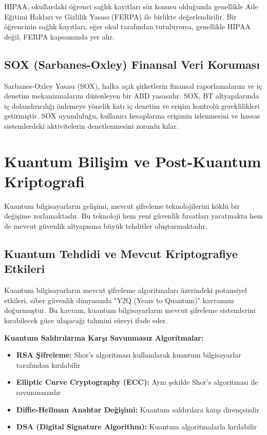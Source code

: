 HIPAA, okullardaki öğrenci sağlık kayıtları söz konusu olduğunda genellikle Aile Eğitimi Hakları ve Gizlilik Yasası (FERPA) ile birlikte değerlendirilir. Bir öğrencinin sağlık kayıtları, eğer okul tarafından tutuluyorsa, genellikle HIPAA değil, FERPA kapsamında yer alır.

\subsection{SOX (Sarbanes-Oxley) Finansal Veri Koruması}

Sarbanes-Oxley Yasası (SOX), halka açık şirketlerin finansal raporlamalarını ve iç denetim mekanizmalarını düzenleyen bir ABD yasasıdır. SOX, BT altyapılarında iç dolandırıcılığı önlemeye yönelik katı iç denetim ve erişim kontrolü gereklilikleri getirmiştir. SOX uyumluluğu, kullanıcı hesaplarına erişimin izlenmesini ve hassas sistemlerdeki aktivitelerin denetlenmesini zorunlu kılar.

\section{Kuantum Bilişim ve Post-Kuantum Kriptografi}

Kuantum bilgisayarların gelişimi, mevcut şifreleme teknolojilerini köklü bir değişime zorlamaktadır. Bu teknoloji hem yeni güvenlik fırsatları yaratmakta hem de mevcut güvenlik altyapısına büyük tehditler oluşturmaktadır.

\subsection{Kuantum Tehdidi ve Mevcut Kriptografiye Etkileri}

Kuantum bilgisayarların mevcut şifreleme algoritmaları üzerindeki potansiyel etkileri, siber güvenlik dünyasında "Y2Q (Years to Quantum)" kavramını doğurmuştur. Bu kavram, kuantum bilgisayarların mevcut şifreleme sistemlerini kırabilecek güce ulaşacağı tahmini süreyi ifade eder.

\textbf{Kuantum Saldırılarına Karşı Savunmasız Algoritmalar:}
\begin{itemize}
    \item \textbf{RSA Şifreleme:} Shor's algoritması kullanılarak kuantum bilgisayarlar tarafından kırılabilir
    \item \textbf{Elliptic Curve Cryptography (ECC):} Aynı şekilde Shor's algoritması ile savunmasızdır
    \item \textbf{Diffie-Hellman Anahtar Değişimi:} Kuantum saldırılara karşı dirençsizdir
    \item \textbf{DSA (Digital Signature Algorithm):} Kuantum algoritmalarla kırılabilir
\end{itemize}

